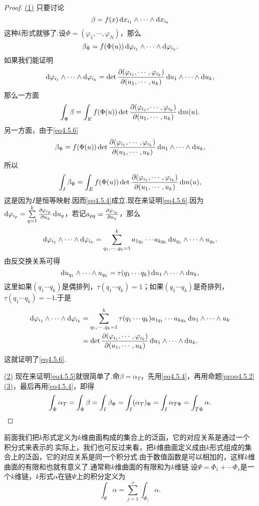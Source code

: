 \begin{proof}
	\hyperlink{4.5.3}{(1)}
	只要讨论
	\[\beta=f(x)\mathop{}\!\mathrm dx_{i_1}\wedge\cdots\wedge\mathop{}\!\mathrm dx_{i_k}\]
	这种$k$形式就够了.设$\Phi=(\varphi_1,\cdots,\varphi_N)$，那么
	\[\beta_\Phi=f(\Phi(u))\mathop{}\!\mathrm{d}\varphi_{i_1}\wedge\cdots\wedge\mathop{}\!\mathrm{d}\varphi_{i_k}.\]
	如果我们能证明
	\begin{equation}\label{eq4.5.6}
		\mathop{}\!\mathrm{d}\varphi_{i_1}\wedge\cdots\wedge\mathop{}\!\mathrm{d}\varphi_{i_k}=\det\frac{\partial (\varphi_{i_1},\cdots,\varphi_{i_k})}{\partial (u_1,\cdots,u_k)}\mathop{}\!\mathrm{d} u_1\wedge\cdots\wedge\mathop{}\!\mathrm{d} u_k,
	\end{equation}
那么一方面
\[\int_\Phi \beta=\int_E f(\Phi(u))\det\frac{\partial (\varphi_{i_1},\cdots,\varphi_{i_k})}{\partial (u_1,\cdots,u_k)}\mathop{}\!\mathrm{d} m(u).\]
另一方面，由于\eqref{eq4.5.6}
\[\beta_\Phi=f(\Phi(u))\det\frac{\partial (\varphi_{i_1},\cdots,\varphi_{i_k})}{\partial (u_1,\cdots,u_k)}\mathop{}\!\mathrm{d} u_1\wedge\cdots\wedge\mathop{}\!\mathrm{d} u_k,\]
所以
\[\int_I \beta_\Phi=\int_E f(\Phi(u))\det\frac{\partial (\varphi_{i_1},\cdots,\varphi_{i_k})}{\partial (u_1,\cdots,u_k)}\mathop{}\!\mathrm{d} m(u),\]
这是因为$I$是恒等映射.因而\eqref{eq4.5.4}成立.现在来证明\eqref{eq4.5.6}.因为$\mathop{}\!\mathrm{d}\varphi_{i_p}=\sum\limits_{q=1}^k \frac{\partial \varphi_{i_p}}{\partial u_q}\mathop{}\!\mathrm{d} u_q$，若记$a_{pq}=\frac{\partial \varphi_{i_p}}{\partial u_q}$，那么
\[\mathop{}\!\mathrm{d}\varphi_{i_1}\wedge\cdots\wedge\mathop{}\!\mathrm{d}\varphi_{i_k}=\sum_{q_1,\cdots,q_k=1}^k a_{1q_1}\cdots a_{kq_k}\mathop{}\!\mathrm{d} u_{q_1}\wedge\cdots\wedge u_{q_k}.\]
由反交换关系可得
\[\mathop{}\!\mathrm{d} u_{q_1}\wedge\cdots\wedge u_{q_k}=\tau(q_1\cdots q_k)\mathop{}\!\mathrm{d} u_1\wedge\cdots\wedge \mathop{}\!\mathrm{d} u_k,\]
这里如果$(q_1\cdots q_k)$是偶排列，$\tau(q_1\cdots q_k)=1$；如果$(q_1\cdots q_k)$是奇排列，$\tau(q_1\cdots q_k)=-1$.于是
\begin{align*}
	\mathop{}\!\mathrm{d}\varphi_{i_1}\wedge\cdots\wedge\mathop{}\!\mathrm{d}\varphi_{i_k}
	&=\sum_{q_1,\cdots,q_k=1}^k \tau(q_1\cdots q_k)a_{1q_1}\cdots a_{kq_k}\mathop{}\!\mathrm{d} u_1\wedge\cdots\wedge u_k\\
	&=\det\frac{\partial (\varphi_{i_1},\cdots,\varphi_{i_k})}{\partial (u_1,\cdots,u_k)}\mathop{}\!\mathrm{d} u_1\wedge\cdots\wedge\mathop{}\!\mathrm{d} u_k.
\end{align*}
这就证明了\eqref{eq4.5.6}.
	
	\hyperlink{4.5.3}{(2)}
	现在来证明\eqref{eq4.5.5}就很简单了.命$\beta=\alpha_T$，先用\eqref{eq4.5.4}，再用命题\ref{prop4.5.2}\hyperlink{4.5.2}{(3)}，最后再用\eqref{eq4.5.4}，即得
	\[\int_\Phi \alpha_T=\int_\Phi \beta=\int_I \beta_\Phi=\int_I (\alpha_T)_\Phi=\int_I \alpha_{T\Phi}=\int_{T\Phi}\alpha.\qedhere\]
\end{proof}
前面我们把$k$形式定义为$k$维曲面构成的集合上的泛函，它的对应关系是通过一个积分式来表示的.实际上，我们也可反过来看，把$k$维曲面定义成由$k$形式组成的集合上的泛函，它的对应关系是同一个积分式.由于数值函数是可以相加的，这样$k$维曲面的有限和也就有意义了.通常称$k$维曲面的有限和为$k$维链.设$\Psi=\Phi_1+\cdots\Phi_s$是一个$k$维链，$k$形式$\alpha$在链$\Psi$上的积分定义为
\[\int_\Psi \alpha=\sum_{j=1}^{s}\int_{\Phi_j}\alpha.\]

